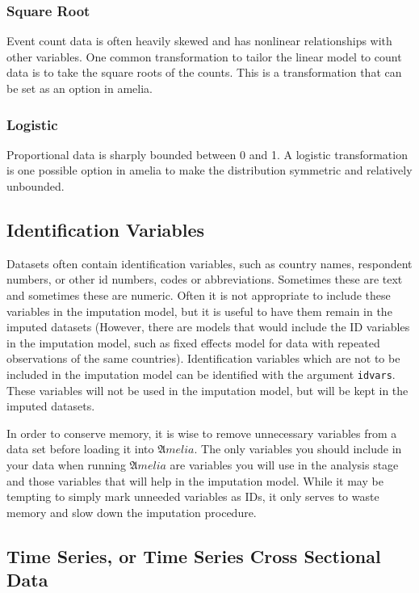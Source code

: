 \documentclass[12pt,titlepage]{article}
\begin{document}
\subsubsection{Square Root}
\label{sec:sqrt}
Event count data is often heavily skewed and has nonlinear
relationships with other variables.  One common transformation to
tailor the linear model to count data is to take the square roots of
the counts.  This is a transformation that can be set as an option in
amelia.
 
\subsubsection{Logistic}
\label{sec:lgstc}
Proportional data is sharply bounded between 0 and 1.  A logistic
transformation is one possible option in amelia to make the
distribution symmetric and relatively unbounded.

\subsection{Identification Variables}
\label{sec:idvars}
Datasets often contain identification variables, such as country
names, respondent numbers, or other id numbers, codes or
abbreviations.  Sometimes these are text and sometimes these are
numeric.  Often it is not appropriate to include these variables in
the imputation model, but it is useful to have them remain in the
imputed datasets (However, there are models that would include the ID
variables in the imputation model, such as fixed effects model for
data with repeated observations of the same countries).
Identification variables which are not to be included in the
imputation model can be identified with the argument \texttt{idvars}.
These variables will not be used in the imputation model, but will be
kept in the imputed datasets.

In order to conserve memory, it is wise to remove unnecessary
variables from a data set before loading it into ${\mathfrak Amelia}$.
The only variables you should include in your data when running
${\mathfrak Amelia}$ are variables you will use in the analysis stage
and those variables that will help in the imputation model.  While it
may be tempting to simply mark unneeded variables as IDs, it only
serves to waste memory and slow down the imputation procedure.

\subsection{Time Series, or Time Series Cross Sectional Data} \label{sec:tscs}
\end{document}
